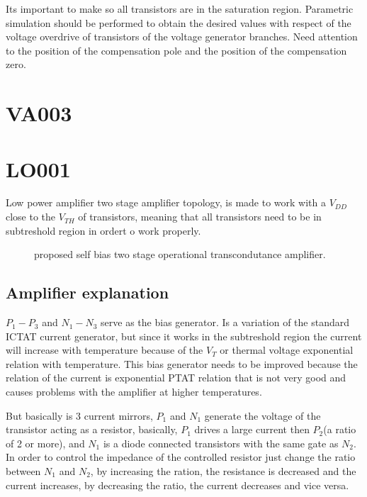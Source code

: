 \documentclass[12pt]{article}
\begin{document}
Its important to make so all transistors are in the saturation region.  Parametric simulation should be performed to obtain the desired values with respect of the voltage overdrive of transistors of the voltage generator branches. Need attention to the position of the compensation pole and the position of the compensation zero.


\section{VA003}




\section{LO001}
Low power amplifier two stage amplifier topology, is made to work with a $V_{DD}$ close to the $V_{TH}$ of transistors, meaning that all transistors need to be in subtreshold region in ordert o work properly.
\begin{figure}[H]
        \centering
        
        \caption{proposed self bias two stage operational transcondutance amplifier.}
        \label{OP}
\end{figure}
\subsection{Amplifier explanation}


$P_1-P_3$ and $N_1-N_3$ serve as the bias generator. Is a variation of the standard ICTAT current generator, but since it works in the subtreshold region the current will increase with temperature because of the $V_T$ or thermal voltage exponential relation with temperature. This bias generator needs to be improved because the relation of the current is exponential PTAT relation that is not very good and causes problems with the amplifier at higher temperatures.

But basically is 3 current mirrors, $P_1$ and $N_1$ generate the voltage of the transistor acting as a resistor, basically, $P_1$ drives a large current then $P_2$(a ratio of 2 or more), and $N_1$ is a diode connected transistors with the same gate as $N_2$. In order to control the impedance of the controlled resistor just change the ratio between $N_1$ and $N_2$, by increasing the ration, the resistance is decreased and the current increases, by decreasing the ratio, the current decreases and vice versa.
\end{document}
